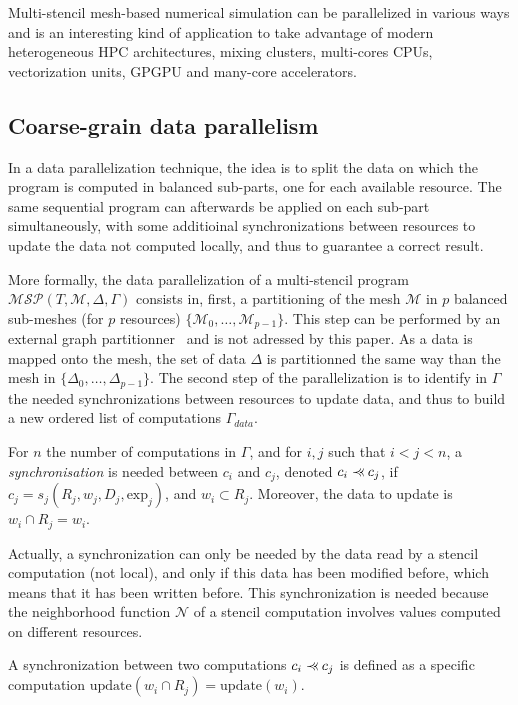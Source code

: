 Multi-stencil mesh-based numerical simulation can be parallelized in various ways and is an interesting kind of application to take advantage of modern heterogeneous HPC architectures, mixing clusters, multi-cores CPUs, vectorization units, GPGPU and many-core accelerators.

\subsection{Coarse-grain data parallelism}
\label{sect:dataparal}
In a data parallelization technique, the idea is to split the data on which the program is computed in balanced sub-parts, one for each available resource. The same sequential program can afterwards be applied on each sub-part simultaneously, with some additioinal synchronizations between resources to update the data not computed locally, and thus to guarantee a correct result.

More formally, the data parallelization of a multi-stencil program $\mathcal{MSP}(T,\mathcal{M},\Delta,\Gamma)$ consists in, first, a partitioning of the mesh $\mathcal{M}$ in $p$ balanced sub-meshes (for $p$ resources) $\{\mathcal{M}_0,\dots,\mathcal{M}_{p-1}\}$. This step can be performed by an external graph partitionner~\cite{} and is not adressed by this paper. As a data is mapped onto the mesh, the set of data $\Delta$ is partitionned the same way than the mesh in $\{\Delta_0,\dots,\Delta_{p-1}\}$. The second step of the parallelization is to identify in $\Gamma$ the needed synchronizations between resources to update data, and thus to build a new ordered list of computations $\Gamma_{data}$.

\begin{mydef}
For $n$ the number of computations in $\Gamma$, and for $i,j$ such that $i<j<n$, a \textit{synchronisation} is needed between $c_i$ and $c_j$, denoted $c_i \pprec c_j$, if $c_j=s_j(R_j,w_j,D_j,\text{exp}_j)$, and $w_i \subset R_j$. Moreover, the data to update is $w_i \cap R_j = w_i$.
\end{mydef}

Actually, a synchronization can only be needed by the data read by a stencil computation (not local), and only if this data has been modified before, which means that it has been written before. This synchronization is needed because the neighborhood function $\mathcal{N}$ of a stencil computation involves values computed on different resources.

\begin{mydef}
A synchronization between two computations $c_i \pprec c_j$ is defined as a specific computation $\text{update}(w_i \cap R_j)=\text{update}(w_i)$.
\end{mydef}

